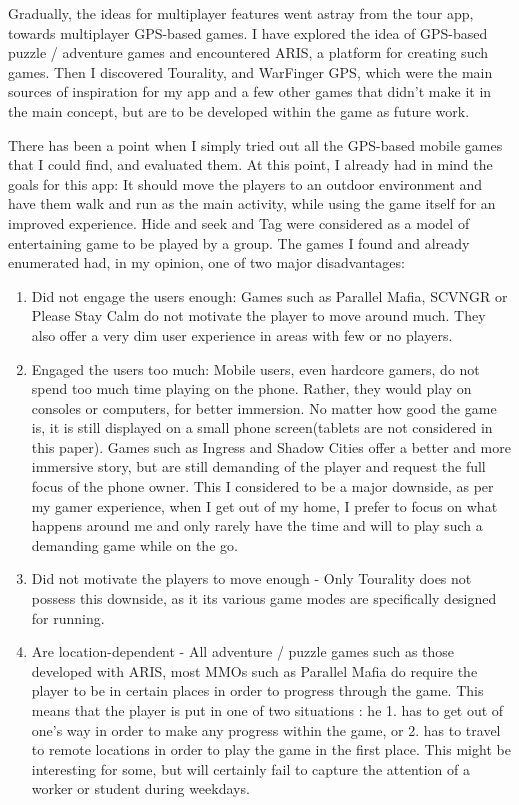 \documentclass{article}
\begin{document}
Gradually, the ideas for multiplayer features went astray from the tour app,
towards multiplayer GPS-based games. I have explored the idea of GPS-based
puzzle / adventure games and encountered ARIS, a platform for creating such
games. Then I discovered Tourality, and WarFinger GPS, which were the main
sources of inspiration for my app and a few other games that didn't make it in
the main concept, but are to be developed within the game as future
work.\newline

There has been a point when I simply tried out all the GPS-based mobile games
that I could find, and evaluated them. At this point, I already had in mind the
goals for this app: It should move the players to an outdoor environment and
have them walk and run as the main activity, while using the game itself for
an improved experience. Hide and seek and Tag were considered as a model of
entertaining game to be played by a group. The games I found and already
enumerated had, in my opinion, one of two major disadvantages:
\begin{enumerate}
  \item Did not engage the users enough: Games such as Parallel Mafia, SCVNGR or
  Please Stay Calm do not motivate the player to move around much. They also
  offer a very dim user experience in areas with few or no players.
  \item Engaged the users too much: Mobile users, even hardcore gamers, do not
  spend too much time playing on the phone. Rather, they would play on consoles
  or computers, for better immersion. No matter how good the game is, it is
  still displayed on a small phone screen(tablets are not considered in this
  paper). Games such as Ingress and Shadow Cities offer a better and more
  immersive story, but are still demanding of the player and request the full
  focus of the phone owner. This I considered to be a major downside, as per my
  gamer experience, when I get out of my home, I prefer to focus on what happens
  around me and only rarely have the time and will to play such a demanding game
  while on the go. 
  \item Did not motivate the players to move enough - Only Tourality does not
  possess this downside, as it its various game modes are specifically designed
  for running.
  \item Are location-dependent - All adventure / puzzle games such as those
  developed with ARIS, most MMOs such as Parallel Mafia do require the player to
  be in certain places in order to progress through the game. This means that
  the player is put in one of two situations : he 1. has to get out of
  one's way in order to make any progress within the game, or 2. has to travel
  to remote locations in order to play the game in the first place. This might
  be interesting for some, but will certainly fail to capture the attention of a
  worker or student during weekdays.
\end{enumerate}
\end{document}
